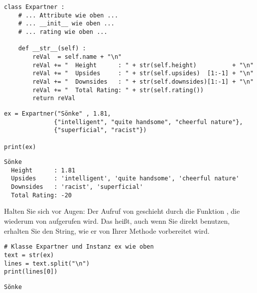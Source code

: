 \begin{codebox}
\begin{verbatim}
class Expartner :
    # ... Attribute wie oben ...
    # ... __init__ wie oben ...
    # ... rating wie oben ...
    
    def __str__(self) :
        reVal  = self.name + "\n"
        reVal += "  Height      : " + str(self.height)          + "\n"
        reVal += "  Upsides     : " + str(self.upsides)  [1:-1] + "\n"
        reVal += "  Downsides   : " + str(self.downsides)[1:-1] + "\n"
        reVal += "  Total Rating: " + str(self.rating())
        return reVal
\end{verbatim}
\end{codebox}
\begin{codebox}[]
\begin{verbatim}
ex = Expartner("Sönke" , 1.81, 
              {"intelligent", "quite handsome", "cheerful nature"},
              {"superficial", "racist"})

print(ex)
\end{verbatim}
\end{codebox}
\begin{cmdbox}
\begin{verbatim}
Sönke
  Height      : 1.81
  Upsides     : 'intelligent', 'quite handsome', 'cheerful nature'
  Downsides   : 'racist', 'superficial'
  Total Rating: -20
\end{verbatim}
\end{cmdbox}

Halten Sie sich vor Augen: Der Aufruf von  geschieht durch die Funktion , die wiederum von  aufgerufen wird. Das heißt, auch wenn Sie direkt  benutzen, erhalten Sie den String, wie er von Ihrer Methode vorbereitet wird.

\begin{codebox}
\begin{verbatim}
# Klasse Expartner und Instanz ex wie oben
text = str(ex)
lines = text.split("\n")
print(lines[0])
\end{verbatim}
\end{codebox}
\begin{cmdbox}
\begin{verbatim}
Sönke
\end{verbatim}
\end{cmdbox}

